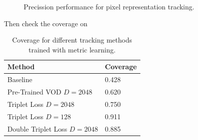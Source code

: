 \begin{figure}[h]
  \centering
  
  \label{fig:tracking_metric_learning}
  \caption{Precission performance for pixel representation tracking.}
\end{figure}

Then check the coverage on 

\begin{table}[h]
  \centering
  \begin{tabular}{l|l}
    \toprule
    Method                       & Coverage \\
    \midrule
    Baseline                     & 0.428    \\
    Pre-Trained VOD $D=2048$     & 0.620    \\
    Triplet Loss $D=2048$        & 0.750    \\
    Triplet Loss $D=128$         & 0.911    \\
    Double Triplet Loss $D=2048$ & 0.885    \\
    \bottomrule
  \end{tabular}
  \caption{Coverage for different tracking methods trained with metric learning. }
  \label{tab:coverage_tracking_metric_learning}
\end{table}


